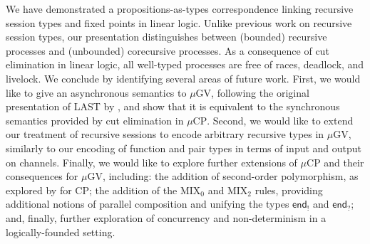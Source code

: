 \documentclass[orivec,envcountsame]{llncs}
\newcommand{\outterm}{\mkwd{end}_!}
\newcommand{\interm}{\mkwd{end}_?}
\newcommand{\mkwd}[1]{\mathsf{#1}}
\newcommand{\mucp}{$\mu\mathrm{CP}$\xspace}
\newcommand{\mugv}{$\mu\mathrm{GV}$\xspace}
\begin{document}
We have demonstrated a propositions-as-types correspondence linking recursive session types and
fixed points in linear logic. Unlike previous work on recursive session types, our presentation
distinguishes between (bounded) recursive processes and (unbounded) corecursive processes. As a
consequence of cut elimination in linear logic, all well-typed processes are free of races,
deadlock, and livelock. We conclude by identifying several areas of future work. First, we would
like to give an asynchronous semantics to \mugv, following the original presentation of LAST by
\citet{GayVasconcelos10}, and show that it is equivalent to the synchronous semantics provided by
cut elimination in \mucp. Second, we would like to extend our treatment of recursive sessions to
encode arbitrary recursive types in \mugv, similarly to our encoding of function and pair types in
terms of input and output on channels. Finally, we would like to explore further extensions of \mucp
and their consequences for \mugv, including: the addition of second-order polymorphism, as explored
by \citet{Wadler12} for CP; the addition of the MIX$_0$ and MIX$_2$ rules, providing additional
notions of parallel composition and unifying the types $\outterm$ and $\interm$; and, finally,
further exploration of concurrency and non-determinism in a logically-founded setting.

\label{sect:bib}


\end{document}
